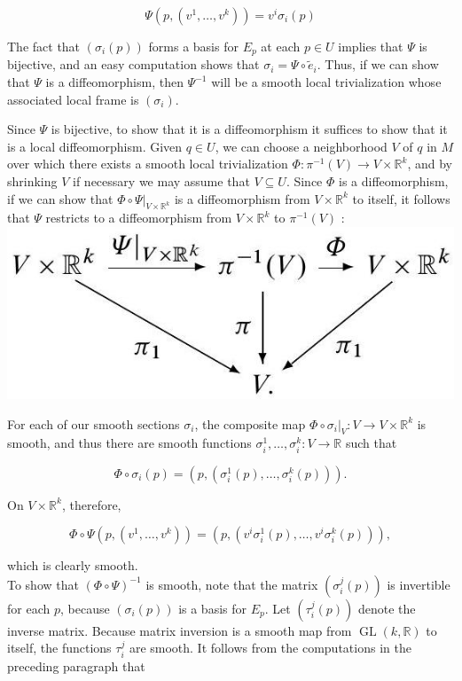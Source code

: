 \documentclass[10pt]{article}
\begin{document}
$$
\Psi\left(p,\left(v^{1}, \ldots, v^{k}\right)\right)=v^{i} \sigma_{i}(p)
$$

The fact that $\left(\sigma_{i}(p)\right)$ forms a basis for $E_{p}$ at each $p \in U$ implies that $\Psi$ is bijective, and an easy computation shows that $\sigma_{i}=\Psi \circ \tilde{e}_{i}$. Thus, if we can show that $\Psi$ is a diffeomorphism, then $\Psi^{-1}$ will be a smooth local trivialization whose associated local frame is $\left(\sigma_{i}\right)$.

Since $\Psi$ is bijective, to show that it is a diffeomorphism it suffices to show that it is a local diffeomorphism. Given $q \in U$, we can choose a neighborhood $V$ of $q$ in $M$ over which there exists a smooth local trivialization $\Phi: \pi^{-1}(V) \rightarrow V \times \mathbb{R}^{k}$, and by shrinking $V$ if necessary we may assume that $V \subseteq U$. Since $\Phi$ is a diffeomorphism, if we can show that $\left.\Phi \circ \Psi\right|_{V \times \mathbb{R}^{k}}$ is a diffeomorphism from $V \times \mathbb{R}^{k}$ to itself, it follows that $\Psi$ restricts to a diffeomorphism from $V \times \mathbb{R}^{k}$ to $\pi^{-1}(V)$ :\\
\includegraphics[max width=\textwidth, center]{2025_06_03_90f64b1a1e243cccc2e0g-277}

For each of our smooth sections $\sigma_{i}$, the composite map $\left.\Phi \circ \sigma_{i}\right|_{V}: V \rightarrow V \times \mathbb{R}^{k}$ is smooth, and thus there are smooth functions $\sigma_{i}^{1}, \ldots, \sigma_{i}^{k}: V \rightarrow \mathbb{R}$ such that

$$
\Phi \circ \sigma_{i}(p)=\left(p,\left(\sigma_{i}^{1}(p), \ldots, \sigma_{i}^{k}(p)\right)\right) .
$$

On $V \times \mathbb{R}^{k}$, therefore,

$$
\Phi \circ \Psi\left(p,\left(v^{1}, \ldots, v^{k}\right)\right)=\left(p,\left(v^{i} \sigma_{i}^{1}(p), \ldots, v^{i} \sigma_{i}^{k}(p)\right)\right),
$$

which is clearly smooth.\\
To show that $(\Phi \circ \Psi)^{-1}$ is smooth, note that the matrix $\left(\sigma_{i}^{j}(p)\right)$ is invertible for each $p$, because $\left(\sigma_{i}(p)\right)$ is a basis for $E_{p}$. Let $\left(\tau_{i}^{j}(p)\right)$ denote the inverse matrix. Because matrix inversion is a smooth map from $\operatorname{GL}(k, \mathbb{R})$ to itself, the functions $\tau_{i}^{j}$ are smooth. It follows from the computations in the preceding paragraph that
\end{document}
